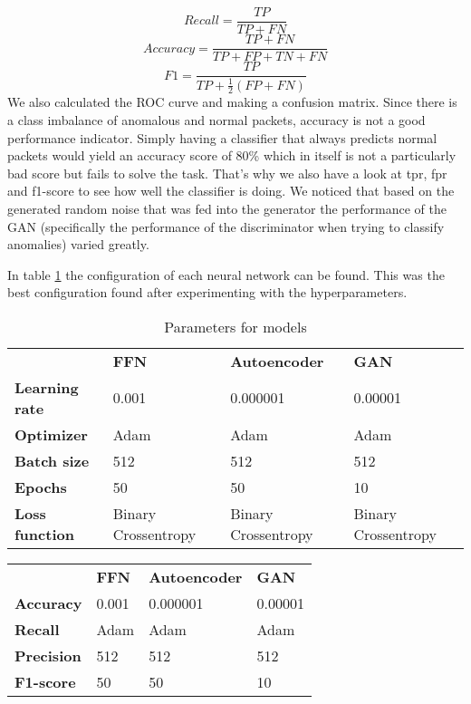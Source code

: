 \documentclass[]{article}
\begin{document}
	\begin{equation}
		Recall = \frac{TP}{TP + FN}
	\end{equation}
	\begin{equation}
		Accuracy = \frac{TP + FN}{TP+FP+TN+FN}
	\end{equation}
\begin{equation}
	F1 = \frac{TP}{TP + \frac{1}{2} (FP+FN)}
\end{equation}
	We also calculated the ROC curve and making a confusion matrix. Since there is a class imbalance of anomalous and normal packets, accuracy is not a good performance indicator. Simply having a classifier that always predicts normal packets would yield an accuracy score of 80\% which in itself is not a particularly bad score but fails to solve the task. That's why we also have a look at tpr, fpr and f1-score to see how well the classifier is doing.  We noticed that based on the generated random noise that was fed into the generator the performance of the GAN (specifically the performance of the discriminator when trying to classify anomalies) varied greatly.
	\newline
	
	\noindent
	In table \ref{table1} the configuration of each neural network can be found. This was the best configuration found after experimenting with the hyperparameters. 
	
	\begin{table}[]
		\begin{tabular}{llll}
			& \textbf{FFN}        & \textbf{Autoencoder} & \textbf{GAN}        \\
			\textbf{Learning rate} & 0.001               & 0.000001             & 0.00001             \\
			\textbf{Optimizer}     & Adam                & Adam                 & Adam                \\
			\textbf{Batch size}    & 512                 & 512                  & 512                 \\
			\textbf{Epochs}        & 50                  & 50                   & 10                  \\
			\textbf{Loss function} & Binary Crossentropy & Binary Crossentropy  & Binary Crossentropy
		\end{tabular}
	\caption{Parameters for models}
	\label{table1}
	\end{table}
	
	\begin{table}[]
		\begin{tabular}{llll}
			& \textbf{FFN} & \textbf{Autoencoder} & \textbf{GAN} \\
			\textbf{Accuracy}  & 0.001        & 0.000001             & 0.00001      \\
			\textbf{Recall}    & Adam         & Adam                 & Adam         \\
			\textbf{Precision} & 512          & 512                  & 512          \\
			\textbf{F1-score}  & 50           & 50                   & 10          
		\end{tabular}
	\end{table}
	
\end{document}
